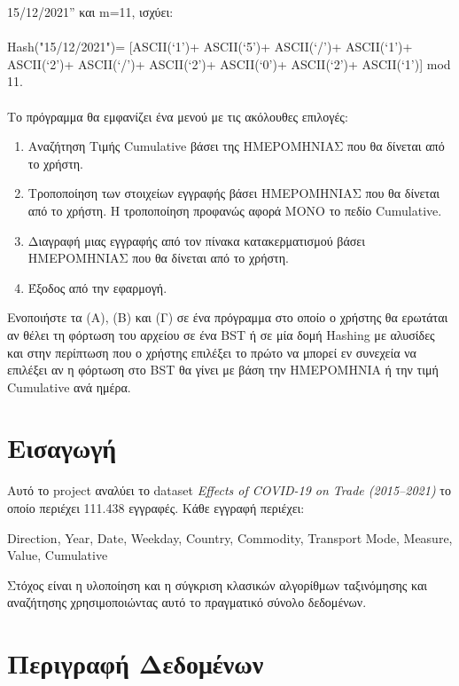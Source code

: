 \documentclass[a4paper,12pt]{article}
\begin{document}
\begin{itemize}
		15/12/2021” και m=11, ισχύει:\\
		\\
		Hash("15/12/2021")= [ASCII(‘1’)+ ASCII(‘5’)+ ASCII(‘/’)+ ASCII(‘1’)+ ASCII(‘2’)+ ASCII(‘/’)+
		ASCII(‘2’)+ ASCII(‘0’)+ ASCII(‘2’)+ ASCII(‘1’)] mod 11.\\
		\\
		Το πρόγραμμα θα εμφανίζει ένα μενού με τις ακόλουθες επιλογές:\\
		\begin{enumerate}
			\item Αναζήτηση Τιμής Cumulative βάσει της ΗΜΕΡΟΜΗΝΙΑΣ που θα δίνεται από το χρήστη.
			\item Τροποποίηση των στοιχείων εγγραφής βάσει ΗΜΕΡΟΜΗΝΙΑΣ που θα δίνεται από το χρήστη. Η τροποποίηση προφανώς αφορά ΜΟΝΟ το πεδίο Cumulative.
			\item Διαγραφή μιας εγγραφής από τον πίνακα κατακερματισμού βάσει ΗΜΕΡΟΜΗΝΙΑΣ που θα δίνεται από το χρήστη.
			\item Έξοδος από την εφαρμογή.
		\end{enumerate}
		Ενοποιήστε τα (Α), (Β) και (Γ) σε ένα πρόγραμμα στο οποίο ο χρήστης θα ερωτάται αν θέλει τη φόρτωση
		του αρχείου σε ένα BST ή σε μία δομή Hashing με αλυσίδες και στην περίπτωση που ο χρήστης επιλέξει
		το πρώτο να μπορεί εν συνεχεία να επιλέξει αν η φόρτωση στο BST θα γίνει με βάση την ΗΜΕΡΟΜΗΝΙΑ
		ή την τιμή Cumulative ανά ημέρα.
	\end{itemize} 
	
	\newpage
	
\section{Εισαγωγή}

Αυτό το project αναλύει το dataset \textit{Effects of COVID-19 on Trade (2015–2021)} το οποίο περιέχει 111.438 εγγραφές. Κάθε εγγραφή περιέχει:

\begin{center}
	Direction, Year, Date, Weekday, Country, Commodity, Transport Mode, Measure, Value, Cumulative
\end{center}

Στόχος είναι η υλοποίηση και η σύγκριση κλασικών αλγορίθμων ταξινόμησης και αναζήτησης χρησιμοποιώντας αυτό το πραγματικό σύνολο δεδομένων.

\section{Περιγραφή Δεδομένων}
\end{document}
